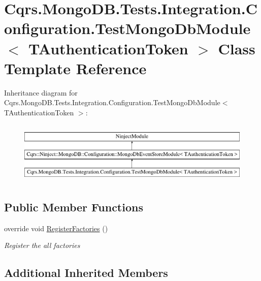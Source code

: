\hypertarget{classCqrs_1_1MongoDB_1_1Tests_1_1Integration_1_1Configuration_1_1TestMongoDbModule}{}\section{Cqrs.\+Mongo\+D\+B.\+Tests.\+Integration.\+Configuration.\+Test\+Mongo\+Db\+Module$<$ T\+Authentication\+Token $>$ Class Template Reference}
\label{classCqrs_1_1MongoDB_1_1Tests_1_1Integration_1_1Configuration_1_1TestMongoDbModule}


 


Inheritance diagram for Cqrs.\+Mongo\+D\+B.\+Tests.\+Integration.\+Configuration.\+Test\+Mongo\+Db\+Module$<$ T\+Authentication\+Token $>$\+:\begin{figure}[H]
\begin{center}
\leavevmode
\includegraphics[height=3.000000cm]{classCqrs_1_1MongoDB_1_1Tests_1_1Integration_1_1Configuration_1_1TestMongoDbModule}
\end{center}
\end{figure}
\subsection*{Public Member Functions}
\begin{DoxyCompactItemize}
\item 
override void \hyperlink{classCqrs_1_1MongoDB_1_1Tests_1_1Integration_1_1Configuration_1_1TestMongoDbModule_aa8a3a1f8c74becc8bb36008abe2c6e0f_aa8a3a1f8c74becc8bb36008abe2c6e0f}{Register\+Factories} ()
\begin{DoxyCompactList}\small\item\em Register the all factories \end{DoxyCompactList}\end{DoxyCompactItemize}
\subsection*{Additional Inherited Members}


